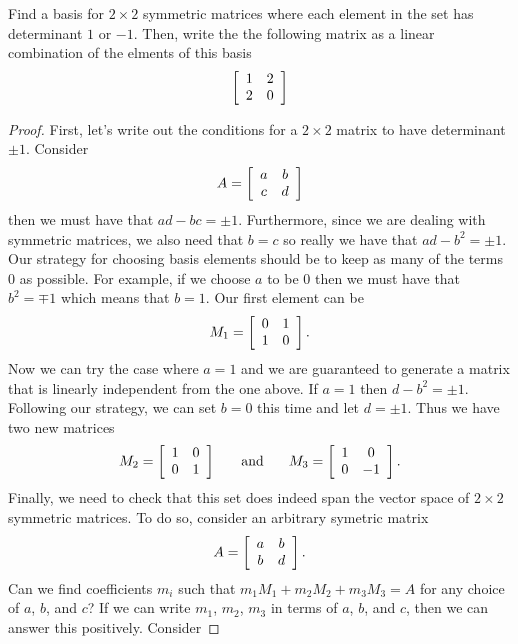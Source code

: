 \documentclass{tutorial}
\begin{document}
\begin{prob}
Find a basis for $2 \times 2$ symmetric matrices where each element in the set has determinant $1$ or $-1$. Then, write the the following matrix as a linear combination of the elments of this basis
\[
  \left[ \begin{array}{cc}
    1 & 2 \\
    2 & 0 
  \end{array} \right]
\]
\end{prob} \ifsolns \begin{proof}
First, let's write out the conditions for a $2 \times 2$ matrix to have determinant $\pm 1$. Consider
\[
  A = \left[ \begin{array}{cc}
    a & b \\
    c & d
  \end{array} \right]
\]
then we must have that $ad-bc = \pm 1$. Furthermore, since we are dealing with symmetric matrices, we also need that $b=c$ so really we have that $ad-b^2 = \pm 1$. Our strategy for choosing basis elements should be to keep as many of the terms $0$ as possible. For example, if we choose $a$ to be $0$ then we must have that $b^2 = \mp 1$ which means that $b=1$. Our first element can be
\[
  M_1 = \left[ \begin{array}{cc}
    0 & 1 \\
    1 & 0
  \end{array} \right] .
\]
Now we can try the case where $a=1$ and we are guaranteed to generate a matrix that is linearly independent from the one above. If $a=1$ then $d-b^2 = \pm 1$. Following our strategy, we can set $b=0$ this time and let $d=\pm 1$. Thus we have two new matrices
\[
  M_2 = \left[ \begin{array}{cc}
    1 & 0 \\
    0 & 1
  \end{array} \right]
  \hspace{0.25in} \text{and} \hspace{0.25in}
  M_3 = \left[ \begin{array}{cc}
    1 & 0 \\
    0 &-1
  \end{array} \right] .
\]
Finally, we need to check that this set does indeed span the vector space of $2 \times 2$ symmetric matrices. To do so, consider an arbitrary symetric matrix
\[
  A = \left[ \begin{array}{cc}
    a & b \\
    b & d
  \end{array} \right] .
\]
Can we find coefficients $m_i$ such that $m_1M_1 + m_2M_2 + m_3M_3 = A$ for any choice of $a$, $b$, and $c$? If we can write $m_1$, $m_2$, $m_3$ in terms of $a$, $b$, and $c$, then we can answer this positively. Consider

\end{proof}
\end{document}
